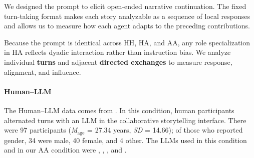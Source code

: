 \documentclass[11pt]{article}
\begin{document}
We designed the prompt to elicit open-ended narrative continuation. The fixed turn-taking format makes each story analyzable as a sequence of local responses and allows us to measure how each agent adapts to the preceding contributions.

Because the prompt is identical across HH, HA, and AA, any role specialization in HA reflects dyadic interaction rather than instruction bias. We analyze individual \textbf{turns} and adjacent \textbf{directed exchanges} to measure response, alignment, and influence.

\paragraph{Human--LLM}
The Human--LLM data comes from \citet{fundal2026directionalalignmentnarrativeagency}. In this condition, human participants alternated turns with an LLM in the collaborative storytelling interface. There were 97 participants (\textit{M}$_{\text{age}}$ = 27.34 years, \textit{SD} = 14.66); of those who reported gender, 34 were male, 40 female, and 4 other. 
The LLMs used in this condition and in our AA condition were , , , and .
\end{document}
